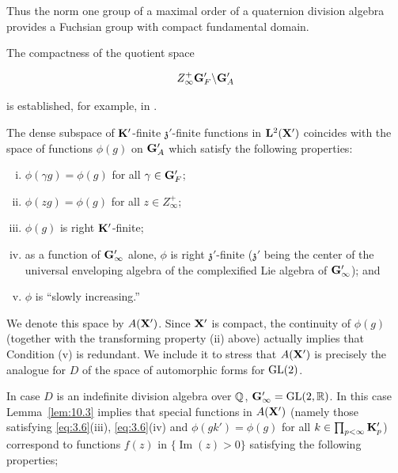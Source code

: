 Thus the norm one group of a maximal order of a quaternion division algebra provides a Fuchsian group with compact fundamental domain.

The compactness of the quotient space

\[
Z_\infty^+ \mathbf{G}'_F \backslash \mathbf{G}'_A
\]

is established, for example, in \cite{Weil4}.

\begin{remark}\label{rem:10.4}

The dense subspace of $\mathbf{K}'$-finite $\mathfrak{z}'$-finite functions in $\mathbf{L}^2(\mathbf{X}')$ coincides with the space of functions $\phi(g)$ on $\mathbf{G}'_A$ which satisfy the following properties:

\begin{enumerate}[(i)]

\item $\phi(\gamma g) = \phi(g)$ for all $\gamma \in \mathbf{G}'_F$;

\item $\phi(zg) = \phi(g)$ for all $z \in Z_\infty^+$;

\item $\phi(g)$ is right $\mathbf{K}'$-finite;

\item as a function of $\mathbf{G}'_\infty$ alone, $\phi$ is right $\mathfrak{z}'$-finite ($\mathfrak{z}'$ being the center of the universal enveloping algebra of the complexified Lie algebra of $\mathbf{G}'_\infty$); and

\item $\phi$ is ``slowly increasing.''

\end{enumerate}

We denote this space by $A(\mathbf{X}')$. Since $\mathbf{X}'$ is compact, the continuity of $\phi(g)$ (together with the transforming property (ii) above) actually implies that Condition (v) is redundant. We include it to stress that $A(\mathbf{X}')$ is precisely the analogue for $D$ of the space of automorphic forms for $\operatorname{GL}(2)$.

\end{remark}

In case $D$ is an indefinite division algebra over $\mathbb{Q}$, $\mathbf{G}'_\infty = \operatorname{GL}(2, \mathbb{R})$. In this case Lemma~\ref{lem:10.3} implies that special functions in $A(\mathbf{X}')$ (namely those satisfying \eqref{eq:3.6}(iii), \eqref{eq:3.6}(iv) and $\phi(gk') = \phi(g)$ for all $k \in \prod_{p < \infty} \mathbf{K}'_p$) correspond to functions $f(z)$ in $\{\operatorname{Im}(z) > 0\}$ satisfying the following properties;

